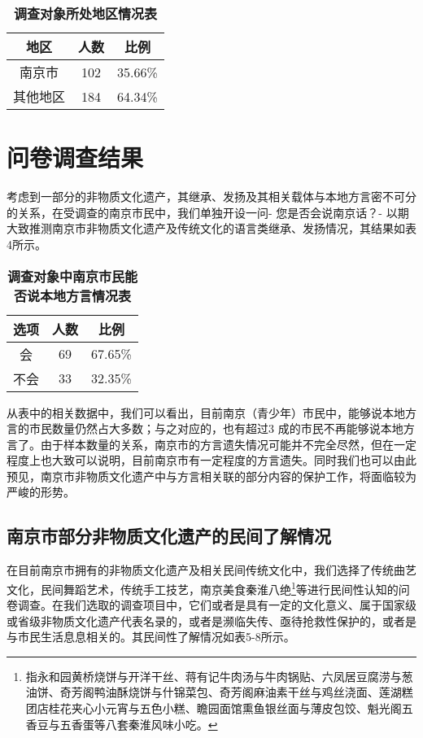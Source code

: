 \documentclass[12pt]{article}%
\begin{document}
\begin{table}[htbp]
\centering
\caption{\bf{调查对象所处地区情况表}}
\begin{tabular}{ccc}
\hline
地区    & 人数    & 比例 \\
\hline
南京市   & 102   & 35.66\% \\
其他地区  & 184   & 64.34\% \\
\hline
\end{tabular}%
\end{table}%


\section{问卷调查结果}

考虑到一部分的非物质文化遗产，其继承、发扬及其相关载体与本地方言密不可分的关系，在受调查的南京市民中，我们单独开设一问- 您是否会说南京话？- 以期大致推测南京市非物质文化遗产及传统文化的语言类继承、发扬情况，其结果如表4所示。

\begin{table}[htbp]
  \centering
  \caption{\bf{调查对象中南京市民能否说本地方言情况表}}
    \begin{tabular}{ccc}
    \hline
    选项    & 人数    & 比例 \\
    \hline
    会     & 69    & 67.65\% \\
    不会    & 33    & 32.35\% \\
    \hline
    \end{tabular}%
\end{table}%

从表中的相关数据中，我们可以看出，目前南京（青少年）市民中，能够说本地方言的市民数量仍然占大多数；与之对应的，也有超过3 成的市民不再能够说本地方言了。由于样本数量的关系，南京市的方言遗失情况可能并不完全尽然，但在一定程度上也大致可以说明，目前南京市有一定程度的方言遗失。同时我们也可以由此预见，南京市非物质文化遗产中与方言相关联的部分内容的保护工作，将面临较为严峻的形势。


\subsection{南京市部分非物质文化遗产的民间了解情况}

在目前南京市拥有的非物质文化遗产及相关民间传统文化中，我们选择了传统曲艺文化，民间舞蹈艺术，传统手工技艺，南京美食秦淮八绝\footnote{
指永和园黄桥烧饼与开洋干丝、蒋有记牛肉汤与牛肉锅贴、六凤居豆腐涝与葱油饼、奇芳阁鸭油酥烧饼与什锦菜包、奇芳阁麻油素干丝与鸡丝浇面、莲湖糕团店桂花夹心小元宵与五色小糕、瞻园面馆熏鱼银丝面与薄皮包饺、魁光阁五香豆与五香蛋等八套秦淮风味小吃。
}等进行民间性认知的问卷调查。在我们选取的调查项目中，它们或者是具有一定的文化意义、属于国家级或省级非物质文化遗产代表名录的，或者是濒临失传、亟待抢救性保护的，或者是与市民生活息息相关的。其民间性了解情况如表5-8所示。
\end{document}
